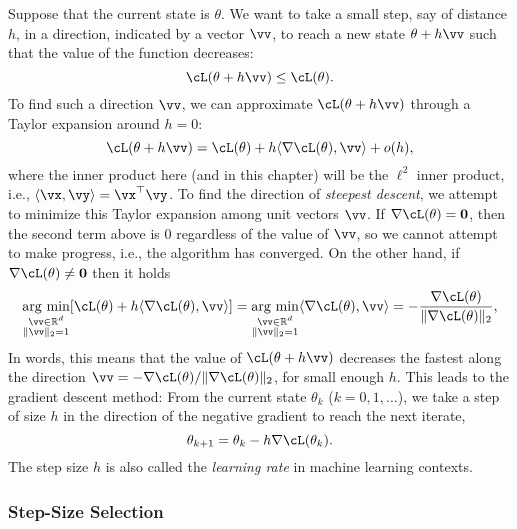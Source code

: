 \documentclass[../../book-main.tex]{subfiles}
\begin{document}
Suppose that the current state is $\theta$. We want to take a small step, say of distance $h$, in a direction, indicated by a vector $\vv$, to reach a new state $\theta + h\vv$ such that the value of the function decreases:
\begin{equation}
    \cL(\theta + h\vv) \leq \cL(\theta).
\end{equation}
To find such a direction $\vv$, we can approximate $\cL(\theta + h\vv)$ through a Taylor expansion around \(h = 0\):
\begin{equation}
    \cL(\theta + h\vv) = \cL(\theta) + h\ip{\nabla \cL(\theta)}{\vv} + o(h),
\end{equation}
where the inner product here (and in this chapter) will be the \(\ell^{2}\) inner product, i.e., \(\ip{\vx}{\vy} = \vx^{\top}\vy\). To find the direction of \textit{steepest descent}, we attempt to minimize this Taylor expansion among unit vectors \(\vv\). If \(\nabla \cL(\theta) = \vzero\), then the second term above is \(0\) regardless of the value of \(\vv\), so we cannot attempt to make progress, i.e., the algorithm has converged. On the other hand, if \(\nabla \cL(\theta) \neq \vzero\) then it holds 
\begin{equation}\label{eq:steepest_descent_l2_norm}
    \argmin_{\substack{\vv \in \R^{d} \\ \norm{\vv}_{2} = 1}} [\cL(\theta) + h\ip{\nabla \cL(\theta)}{\vv}] = \argmin_{\substack{\vv \in \R^{d} \\ \norm{\vv}_{2} = 1}} \ip{\nabla \cL(\theta)}{\vv} = -\frac{\nabla \cL(\theta)}{\norm{\nabla \cL(\theta)}_{2}},
\end{equation}
In words, this means that the value of \(\cL(\theta + h\vv)\) decreases the fastest along the direction \(\vv = -\nabla \cL(\theta) / \norm{\nabla \cL(\theta)}_{2}\), for small enough \(h\). This leads to the gradient descent method: From the current state $\theta_k$ ($k=0, 1, \ldots$), we take a step of size $h$ in the direction of the negative gradient to reach the next iterate,
\begin{equation}
    \theta_{k+1} = \theta_k - h \nabla \cL(\theta_k). 
\end{equation}
The step size \(h\) is also called the \textit{learning rate} in machine learning contexts.

\subsubsection{Step-Size Selection}
\end{document}
